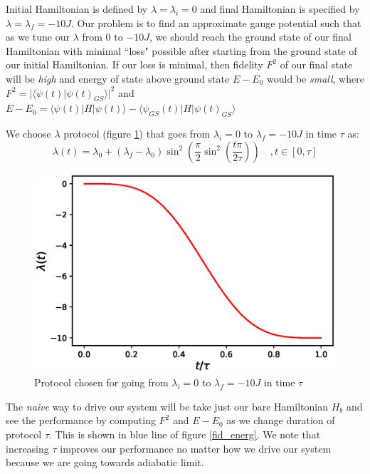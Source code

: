 \documentclass[11pt,a4paper]{article}
\begin{document}
Initial Hamiltonian is defined by $\lambda=\lambda_i=0$ and final Hamiltonian is specified by $\lambda=\lambda_f=-10J$. Our problem is to find an approximate gauge potential such that as we tune our $\lambda$ from $0$ to $-10J$, we should reach the ground state of our final Hamiltonian with minimal ``loss" possible after starting from the ground state of our initial Hamiltonian. If our loss is minimal, then fidelity $F^2$ of our final state will be \textit{high} and energy of state above ground state $E-E_0$ would be \textit{small}, where  $F^2 =  |\langle \psi (t) |\psi(t)_{GS}\rangle|^2$ and $ E-E_0=\langle \psi (t) |H|\psi(t)\rangle - \langle \psi_{GS} (t) |H|\psi(t)_{GS}\rangle$ 

 We choose $\lambda$  protocol (figure \ref{protocol_figure}) that goes from $\lambda_i=0$ to $\lambda_f=-10 J$ in time $\tau$ as:
\begin{equation}
\lambda(t) = \lambda_0 + (\lambda_f-\lambda_0)\sin^2\left(\dfrac{\pi}{2}\sin^2\left(\dfrac{t\pi}{2 \tau}\right)  \right) \quad, t \in [0, \tau]
\end{equation}

\begin{figure}
\centering
\includegraphics[scale=0.67]{protocol.eps}
\caption{Protocol chosen for going from $\lambda_i=0$ to $\lambda_f=-10J$ in time $\tau$}
\label{protocol_figure}
\end{figure}

The \textit{naive} way to drive our system will be take just our bare Hamiltonian $H_b$ and see the performance by computing $F^2$ and $E-E_0$ as we change duration of protocol $\tau$. This is shown in blue line of figure \ref{fid_energ}. We note that increasing $\tau$ improves our performance no matter how we drive our system because we are going towards adiabatic limit.
\end{document}
